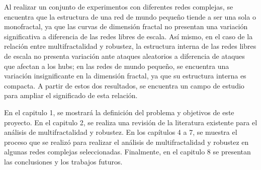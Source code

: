 Al realizar un conjunto de experimentos con diferentes redes complejas, se encuentra que la estructura de una red de mundo pequeño tiende a ser una sola o monofractal, ya que las curvas de dimensión fractal no presentan una variación significativa a diferencia de las redes libres de escala. Así mismo, en el caso de la relación entre multifractalidad y robustez, la estructura interna de las redes libres de escala no presenta variación ante ataques aleatorios a diferencia de ataques que afectan a los hubs; en las redes de mundo pequeño, se encuentra una variación insignificante en la dimensión fractal, ya que su estructura interna es compacta. A partir de estos dos resultados, se encuentra un campo de estudio para ampliar el significado de esta relación.

En el capitulo 1, se mostrará la definición del problema y objetivos de este proyecto. En el capitulo 2, se realiza una revisión de la literatura existente para el análisis de multifractalidad y robustez. En los capítulos 4 a 7, se muestra el proceso que se realizó para realizar el análisis de multifractalidad y robustez en algunas redes complejas seleccionadas. Finalmente, en el capitulo 8 se presentan las conclusiones y los trabajos futuros.